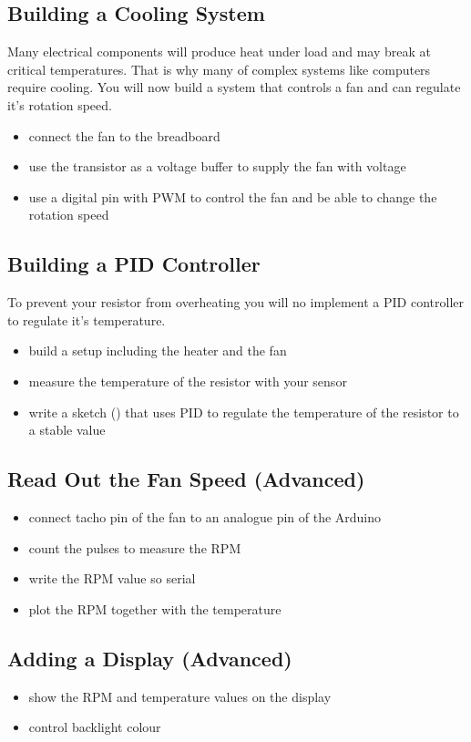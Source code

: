 \subsection{Building a Cooling System}\label{sec:cool}
Many electrical components will produce heat under load and may break at critical temperatures. That is why many of complex systems like computers require cooling. You will now build a system that controls a fan and can regulate it's rotation speed.
\begin{itemize}
	\item connect the fan to the breadboard
	\item use the transistor as a voltage buffer to supply the fan with voltage
	\item use a digital pin with \ac{PWM} to control the fan and be able to change the rotation speed
\end{itemize}

\subsection{Building a PID Controller}
To prevent your resistor from overheating you will no implement a \ac{PID} controller to regulate it's temperature.
\begin{itemize}
	\item build a setup including the heater and the fan
	\item measure the temperature of the resistor with your sensor
	\item write a sketch () that uses \ac{PID} to regulate the temperature of the resistor to a stable value
\end{itemize}


\subsection{Read Out the Fan Speed (Advanced)}
\begin{itemize}
	\item connect tacho pin of the fan to an analogue pin of the Arduino
	\item count the pulses to measure the \ac{RPM}
	\item write the \ac{RPM} value so serial
	\item plot the \ac{RPM} together with the temperature
\end{itemize}

\subsection{Adding a Display (Advanced)}
\begin{itemize}
	\item show the \ac{RPM} and temperature values on the display
	\item control backlight colour
\end{itemize}











